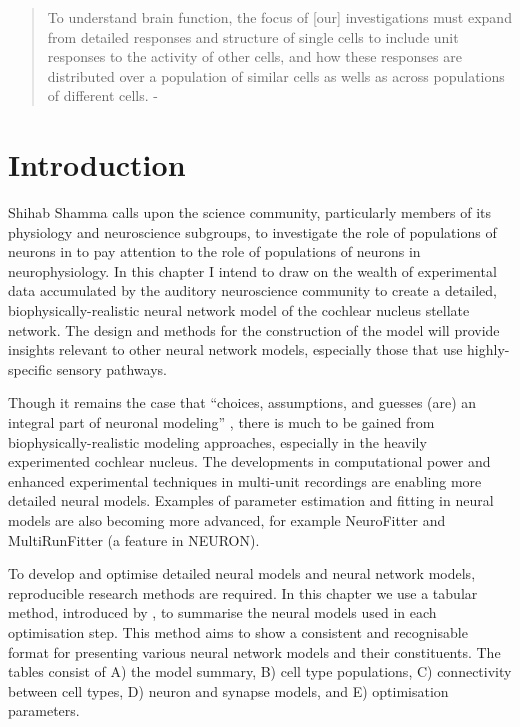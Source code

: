  

\begin{quotation}
  To understand brain function, the focus of [our] investigations must
  expand from detailed responses and structure of single cells to
  include unit responses to the activity of other cells, and how these
  responses are distributed over a population of similar cells as
  wells as across populations of different cells.  - \emph{\citet{Shamma:1998}}
\end{quotation}




\section{Introduction}

Shihab Shamma calls upon the science community, particularly members
of its physiology and neuroscience subgroups, to investigate the role
of populations of neurons in to pay attention to the role of
populations of neurons in neurophysiology. In this chapter I intend to
draw on the wealth of experimental data accumulated by the auditory
neuroscience community to create a detailed, biophysically-realistic
neural network model of the cochlear nucleus stellate network.  The
design and methods for the construction of the model will provide
insights relevant to other neural network models, especially those
that use highly-specific sensory pathways.

\medskip{}

Though it remains the case that ``choices, assumptions, and guesses
(are) an integral part of neuronal modeling''
\citep{SegevBurkeEtAl:1998}, there is much to be gained from
biophysically-realistic modeling approaches, especially in the heavily
experimented cochlear nucleus. The developments in computational power
and enhanced experimental techniques in multi-unit recordings are
enabling more detailed neural models. Examples of parameter estimation
and fitting in neural models are also becoming more advanced, for
example NeuroFitter \citep{citation} and MultiRunFitter (a feature in
NEURON).  

\medskip{}

  To develop and optimise detailed neural models and
neural network models, reproducible research methods are required. In
this chapter we use a tabular method, introduced by
\citet{NordlieGewaltigEtAl:2009}, to summarise the neural models used in each
optimisation step. This method aims to show a consistent and
recognisable format for presenting various neural network models and
their constituents.  The tables consist of A) the model summary, B)
cell type populations, C) connectivity between cell types, D) neuron
and synapse models, and E) optimisation parameters.

